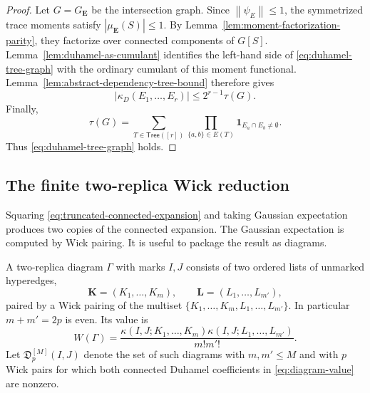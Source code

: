 \documentclass[11pt]{article}
\newcommand{\ind}{\mathbf{1}}
\newcommand{\norm}[1]{\left\lVert #1\right\rVert}
\begin{document}
\begin{proof}
  Let $G=G_{\mathbf E}$ be the intersection graph.  Since
  $\norm{\psi_E}\leq1$, the symmetrized trace moments satisfy
  $|\mu_{\mathbf E}(S)|\leq1$.  By
  Lemma~\ref{lem:moment-factorization-parity}, they factorize over connected
  components of $G[S]$.  Lemma~\ref{lem:duhamel-as-cumulant} identifies the
  left-hand side of \eqref{eq:duhamel-tree-graph} with the ordinary cumulant of
  this moment functional.  Lemma~\ref{lem:abstract-dependency-tree-bound}
  therefore gives
  \begin{equation}\label{eq:duhamel-tree-proof-final}
    |\kappa_D(E_1,\ldots,E_r)|
    \leq
    2^{r-1}\tau(G).
  \end{equation}
  Finally,
  \begin{equation}\label{eq:tau-expanded-tree-sum}
    \tau(G)
    =
    \sum_{T\in\mathsf{Tree}([r])}
    \prod_{\{a,b\}\in E(T)}
    \ind_{E_a\cap E_b\neq\emptyset}.
  \end{equation}
  Thus \eqref{eq:duhamel-tree-graph} holds.
\end{proof}

\subsection{The finite two-replica Wick reduction}

Squaring \eqref{eq:truncated-connected-expansion} and taking Gaussian
expectation produces two copies of the connected expansion.  The Gaussian
expectation is computed by Wick pairing.  It is useful to package the result as
diagrams.

A two-replica diagram $\Gamma$ with marks $I,J$ consists of two ordered lists of
unmarked hyperedges,
\begin{equation}\label{eq:two-replica-lists}
  \mathbf K=(K_1,
  \ldots,K_m),
  \qquad
  \mathbf L=(L_1,
  \ldots,L_{m'}),
\end{equation}
paired by a Wick pairing of the multiset
$\{K_1,
\ldots,K_m,L_1,
\ldots,L_{m'}\}$.  In particular $m+m'=2p$ is even.  Its value is
\begin{equation}\label{eq:diagram-value}
  W(\Gamma)
  =
  \frac{
    \kappa(I,J;K_1,
    \ldots,K_m)
    \kappa(I,J;L_1,
    \ldots,L_{m'})
  }{m!m'!}.
\end{equation}
Let $\mathfrak D_p^{[M]}(I,J)$ denote the set of such diagrams with
$m,m'\leq M$ and with $p$ Wick pairs for which both connected Duhamel
coefficients in \eqref{eq:diagram-value} are nonzero.
\end{document}
